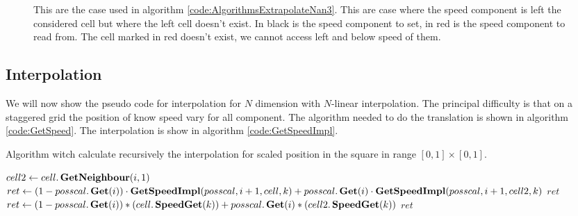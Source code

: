 \begin{figure}
\begin{center}
{
}
\end{center}
\caption{This are the case used in algorithm \ref{code:AlgorithmsExtrapolateNan3}. This are case where the speed component
is left the considered cell but where the left cell doesn't exist. In black is the speed component to set, in red is the speed component to read from. The cell marked in red doesn't exist, we cannot access left and below speed of them.}
\end{figure}
\subsection{Interpolation}

We will now show the pseudo code for interpolation for $N$ dimension with $N$-linear interpolation.
The principal difficulty is that on a staggered grid the position of know speed vary for all component.
The algorithm needed to do the translation is shown in algorithm \ref{code:GetSpeed}.
The interpolation is show in algorithm \ref{code:GetSpeedImpl}.

\begin{algorithm}
\caption{Algorithm witch calculate recursively the interpolation for scaled position in the square in range $[0,1]\times[0,1]$.}
\label{code:GetSpeedImpl}
\begin{algorithmic}[1]
\State $cell2 \gets cell.\mathop{\textbf{GetNeighbour}}(i,1)$
			\State $ret \gets (1-posscal.\mathop{\textbf{Get}}(i))\cdot \mathop{\textbf{GetSpeedImpl}}(posscal,i+1,cell,k)+posscal.\mathop{\textbf{Get}}(i)\cdot \mathop{\textbf{GetSpeedImpl}}(posscal,i+1,cell2,k)$
			\State \Return $ret$
		\Else {}
			\State $ret\gets (1-posscal.\mathop{\textbf{Get}}(i))*(cell.\mathop{\textbf{SpeedGet}}(k))+posscal.\mathop{\textbf{Get}}(i)*(cell2.\mathop{\textbf{SpeedGet}}(k))$
			\State \Return $ret$
		\EndIf
\EndFunction
\end{algorithmic}
\end{algorithm}

